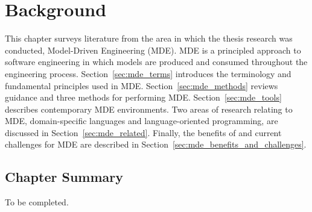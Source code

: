 
\chapter{Background}
\label{Background}
This chapter surveys literature from the area in which the thesis research was conducted, Model-Driven Engineering (MDE). MDE is a principled approach to software engineering in which models are produced and consumed throughout the engineering process. Section~\ref{sec:mde_terms} introduces the terminology and fundamental principles used in MDE. Section~\ref{sec:mde_methods} reviews guidance and three methods for performing MDE. Section~\ref{sec:mde_tools} describes contemporary MDE environments. Two areas of research relating to MDE, domain-specific languages and language-oriented programming, are discussed in Section~\ref{sec:mde_related}. Finally, the benefits of and current challenges for MDE are described in Section~\ref{sec:mde_benefits_and_challenges}.







\section{Chapter Summary}
To be completed.